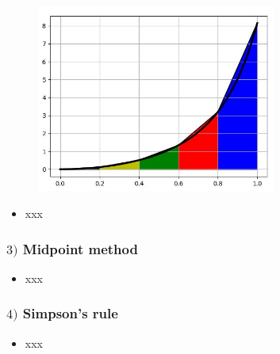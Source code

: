 \documentclass[english,14pt]{beamer}
\begin{document}
\begin{frame}[fragile]

\frametitle{}

\begin{figure}[ht]
	\centering
	\includegraphics[width=0.7\textwidth]{figures/fivePanel}
\end{figure}

\begin{itemize}
	\item xxx
\end{itemize}

\end{frame}


\begin{frame}[fragile]

\frametitle{$3)$ Midpoint method}

\begin{itemize}
	\item xxx
\end{itemize}

\end{frame}


\begin{frame}[fragile]

\frametitle{$4)$ Simpson's rule}

\begin{itemize}
	\item xxx
\end{itemize}

\end{frame}

\end{document}
